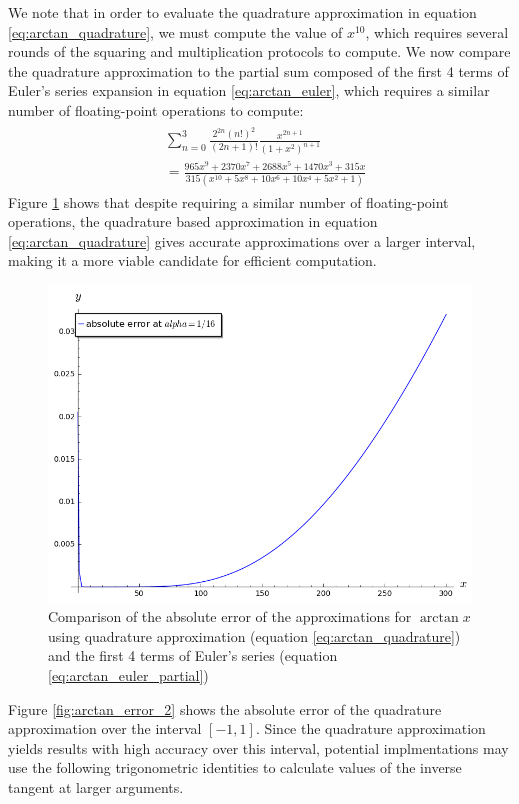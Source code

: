 We note that in order to evaluate the quadrature approximation in equation \ref{eq:arctan_quadrature}, we must compute the value of $x^{10}$, which requires several rounds of the squaring and multiplication protocols to compute. We now compare the quadrature approximation to the partial sum composed of the first 4 terms of Euler's series expansion in equation \ref{eq:arctan_euler}, which requires a similar number of floating-point operations to compute:
\begin{align} \label{eq:arctan_euler_partial}
	\begin{split}
		&\sum_{n=0}^{3}
		{
		\frac
			{2^{2n}(n!)^2}
			{(2n+1)!}
		\frac
			{x^{2n+1}}
			{(1+x^2)^{n+1}}
		}\\
		&= \frac
		{965x^9 + 2370x^7 + 2688x^5 + 1470x^3 + 315x}
		{315(x^10 + 5x^8 + 10x^6 + 10x^4 + 5x^2 + 1)}
	\end{split}
\end{align}
Figure \ref{fig:arctan_error} shows that despite requiring a similar number of floating-point operations, the quadrature based approximation in equation \ref{eq:arctan_quadrature} gives accurate approximations over a larger interval, making it a more viable candidate for efficient computation.
\begin{figure}[!ht]
		\centering
		\includegraphics[width=.9\linewidth]{figures/single_alpha_plot.png}
		\caption{Comparison of the absolute error of the approximations for $\arctan x$ using quadrature approximation (equation \ref{eq:arctan_quadrature}) and the first 4 terms of Euler's series (equation \ref{eq:arctan_euler_partial})}
		\label{fig:arctan_error}
\end{figure}
Figure \ref{fig:arctan_error_2} shows the absolute error of the quadrature approximation over the interval $[-1,1]$. Since the quadrature approximation yields results with high accuracy over this interval, potential implmentations may use the following trigonometric identities to calculate values of the inverse tangent at larger arguments.
